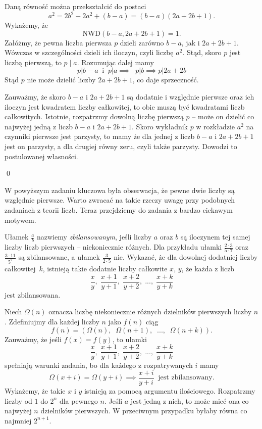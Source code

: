 \noindent
Daną równość można przekształcić do postaci
\[
	a^2 = 2b^2 - 2a^2 + (b - a) = (b - a)(2a + 2b + 1).
\]
Wykażemy, że
\[
	\mathrm{NWD}(b - a, 2a + 2b + 1) = 1.
\]
Załóżmy, że pewna liczba pierwsza $p$ dzieli zarówno $b - a$, jak i $2a + 2b + 1$. Wówczas w szczególności dzieli ich iloczyn, czyli liczbę $a^2$. Stąd, skoro $p$ jest liczbą pierwszą, to $p \mid a$. Rozumując dalej mamy
\[
	 p | b - a \;\; \text{i} \;\; p | a \implies \;\; p | b \implies p|2a + 2b
\]
Stąd $p$ nie może dzielić liczby $2a + 2b + 1$, co daje sprzeczność.

\vspace{10px}
\noindent
Zauważmy, że skoro $b - a$ i $2a + 2b + 1$ są dodatnie i względnie pierwsze oraz ich iloczyn jest kwadratem liczby całkowitej, to obie muszą być kwadratami liczb całkowitych. Istotnie, rozpatrzmy dowolną liczbę pierwszą $p$ -- może on dzielić co najwyżej jedną z liczb $b - a$ i $2a + 2b + 1$. Skoro wykładnik $p$ w rozkładzie $a^2$ na czynniki pierwsze jest parzysty, to mamy że dla jednej z liczb $b - a$ i $2a + 2b + 1$ jest on parzysty, a dla drugiej równy zeru, czyli także parzysty. Dowodzi to postulowanej własności.

\qed

\noindent
W powyższym zadaniu kluczowa była obserwacja, że pewne dwie liczby są względnie pierwsze. Warto zwracać na takie rzeczy uwagę przy podobnych zadaniach z teorii liczb. Teraz przejdziemy do zadania z bardzo ciekawym motywem.

\vspace{10px}


\noindent
Ułamek $\frac{a}{b}$ nazwiemy \textit{zbilansowanym}, jeśli liczby $a$ oraz $b$ są iloczynem tej samej liczby liczb pierwszych -- niekoniecznie różnych. Dla przykładu ułamki $\frac{2 \cdot 3}{5 \cdot 7}$ oraz $\frac{3 \cdot 11}{5^2}$ są zbilansowane, a ułamek $\frac{3}{2 \cdot 5}$ nie. Wykazać, że dla dowolnej dodatniej liczby całkowitej~$k$, istnieją takie dodatnie liczby całkowite $x$, $y$, że każda z liczb
\[
	\frac{x}{y}, \; \frac{x + 1}{y + 1}, \; \frac{x + 2}{y + 2}, \; ..., \; \frac{x + k}{y + k}
\]  
jest zbilansowana.

\vspace{5px}


\noindent
Niech $\Omega(n)$ oznacza liczbę niekoniecznie różnych dzielników pierwszych liczby $n$.
Zdefiniujmy dla każdej liczby $n$ jako $f(n)$ ciąg 
\[
	f(n) = (\Omega(n),\;\; \Omega(n + 1),\;\; ...,\;\; \Omega(n + k)).
\]
Zauważmy, że jeśli $f(x) = f(y)$, to ułamki
\[
	\frac{x}{y}, \; \frac{x + 1}{y + 1}, \; \frac{x + 2}{y + 2}, \; ..., \; \frac{x + k}{y + k}
\]
spełniają warunki zadania, bo dla każdego z rozpatrywanych $i$ mamy
\[
	\Omega(x + i) = \Omega(y + i) \implies \frac{x + i}{y + i} \;\; \text{jest zbilansowany}.
\]
Wykażemy, że takie $x$ i $y$ istnieją za pomocą argumentu ilościowego. Rozpatrzmy liczby od $1$ do $2^n$ dla pewnego $n$. Jeśli $a$ jest jedną z nich, to może mieć ona co najwyżej $n$ dzielników pierwszych. W przeciwnym przypadku byłaby równa co najmniej $2^{n + 1}$. 

